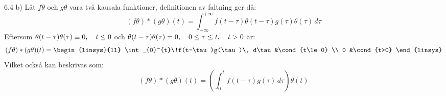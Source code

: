 \begin{task}{6.4 b)}
	Låt $f\theta$ och $g\theta$ vara två kausala funktioner, definitionen av faltning ger då:
	\[(f\theta)*(g\theta)(t)=
	\int_{-\infty}^{+\infty}\!f(t-\tau)\theta(t-\tau)g(\tau)\theta(\tau)\, d\tau\]
	Eftersom $\theta(t-\tau)\theta(\tau)\equiv0, \quad t\le 0$ och $\theta(t-\tau)\theta(\tau)=0, \quad 0\le\tau\le t, \quad t > 0$ är:
	\[(f\theta)*(g\theta)(t)=\begin{linsys}{ll}
	\int_{0}^{t}\!f(t-\tau)g(\tau)\, d\tau&\cond{t\le0} \\
	0                                     &\cond{t>0}
	\end{linsys}\]
	Vilket också kan beskrivas som:
	\[(f\theta)*(g\theta)(t)=
	\left(\int_{0}^{t}\!f(t-\tau)g(\tau)\, d\tau\right)\theta(t)\]
\end{task}